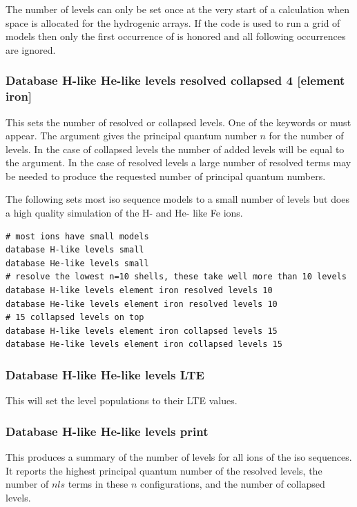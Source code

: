 The number of levels can only be set once at the very start of a
calculation when space is allocated for the hydrogenic arrays.
If the code
is used to run a grid of models then only the first occurrence of
 is honored and all following occurrences
are ignored.

\subsubsection{Database H-like \OR{} He-like levels resolved \OR{} collapsed  4 [element iron]}

This sets the number of resolved or collapsed levels.
One of the keywords  or  must appear.
The argument gives the principal quantum
number $n$ for the number of levels.
In the case of collapsed levels the number of added levels will be equal to the argument.
In the case of resolved levels a large number of resolved terms may be needed
to produce the requested number of principal quantum numbers.

The following sets most iso sequence models to a small number of levels
but does a high quality simulation of the H- and He- like Fe ions.
\begin{verbatim}
# most ions have small models
database H-like levels small
database He-like levels small
# resolve the lowest n=10 shells, these take well more than 10 levels
database H-like levels element iron resolved levels 10
database He-like levels element iron resolved levels 10
# 15 collapsed levels on top
database H-like levels element iron collapsed levels 15
database He-like levels element iron collapsed levels 15
\end{verbatim}

\subsubsection{Database H-like \OR{} He-like levels LTE}

This will set the level populations to their LTE values.

\subsubsection{Database H-like \OR{} He-like levels print}

This produces a summary of the number of levels for all ions of the iso sequences.
It reports the highest principal quantum number of the resolved levels,
the number of $nls$ terms in these $n$ configurations,
and the number of collapsed levels.

